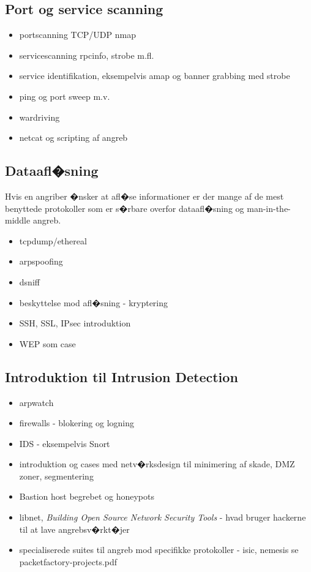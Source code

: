 \documentclass[a4paper,12pt]{article}
\begin{document}
\subsection{Port og service scanning}
\begin{itemize}
\item portscanning TCP/UDP nmap
\item servicescanning rpcinfo, strobe m.fl.
\item service identifikation, eksempelvis amap og banner grabbing med strobe
\item ping og port sweep m.v.
\item wardriving
\item netcat og scripting af angreb
\end{itemize}


\subsection{Dataafl�sning}

Hvis en angriber �nsker at afl�se informationer er der mange af de mest
benyttede protokoller som er s�rbare overfor dataafl�sning og
man-in-the-middle angreb.

\begin{itemize}
\item tcpdump/ethereal
\item arpspoofing
\item dsniff
\item beskyttelse mod afl�sning - kryptering
\item SSH, SSL, IPsec introduktion
\item WEP som case
\end{itemize}

\subsection{Introduktion til Intrusion Detection}


\begin{itemize}
\item arpwatch
\item firewalls - blokering og logning
\item IDS - eksempelvis Snort
\item introduktion og cases med netv�rksdesign til minimering af
  skade, DMZ zoner, segmentering
\item Bastion host begrebet og honeypots
\item libnet, \emph{Building Open Source Network Security Tools} -
  hvad bruger hackerne til at lave angrebsv�rkt�jer
\item specialiserede suites til angreb mod specifikke protokoller -
  isic, nemesis se packetfactory-projects.pdf

\end{itemize}
\end{document}
